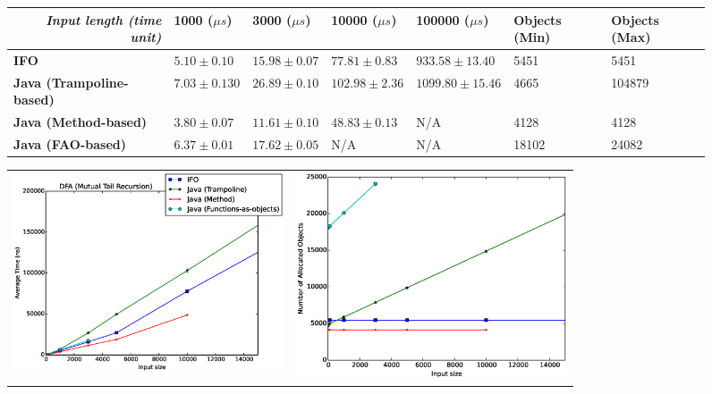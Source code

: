 \begin{figure}[h!t]
\vspace{10pt}
 \begin{center} 
\begin{tabular}{|l|l|l|l|l||l|l|}
\hline
\multicolumn{1}{|r|}{\textit{\textbf{Input length (time unit)}}} & 1000 ($\mu s$)                 & 3000 ($\mu s$)                  & 10000 ($\mu s$)                   & 100000 ($\mu s$)    & Objects (Min) & Objects (Max)               \\ \hline
\textbf{IFO}                                  & $5.10 \pm 0.10$   & $15.98 \pm 0.07$  & $77.81 \pm 0.83$   & $933.58 \pm 13.40$ &  5451 & 5451    \\ \hline
\textbf{Java (Trampoline-based)}                             & $7.03 \pm 0.130$ & $26.89 \pm 0.10$ & $102.98 \pm 2.36$ & $1099.80 \pm 15.46$ & 4665 & 104879\\ \hline
\textbf{Java (Method-based)}                             & $3.80 \pm 0.07$  & $11.61 \pm 0.10$  & $48.83 \pm 0.13$    & N/A  & 4128 & 4128                      \\ \hline
\textbf{Java (FAO-based)}                           & $6.37 \pm 0.01$   & $17.62 \pm 0.05$  & N/A                     & N/A & 18102 & 24082                       \\ \hline
\end{tabular}
  \begin{tabular}{ll}
  \begin{minipage}{8cm}{\includegraphics[width=8cm]{./src/img/dfa1.eps}}\end{minipage} &
\begin{minipage}{8cm}{\includegraphics[width=8cm]{./src/img/dfa2.eps}}\end{minipage} 
\end{tabular}


\end{center}
\end{figure}
